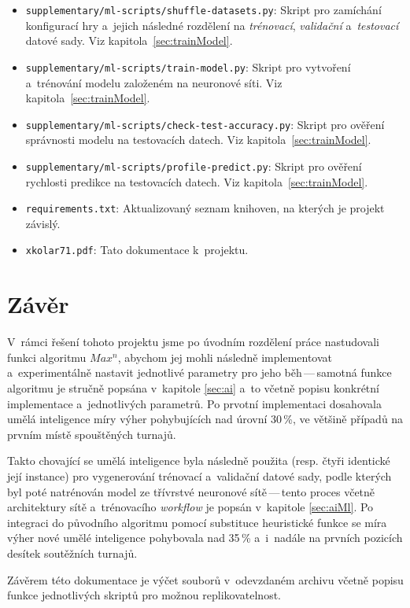 \documentclass[11pt, a4paper]{article}
\theoremstyle{definition}
\begin{document}
\begin{itemize}
    \item
        \texttt{supplementary/ml-scripts/shuffle-datasets.py}: Skript pro
        zamíchání konfigurací hry a~jejich následné rozdělení na
        \emph{trénovací}, \emph{validační} a~\emph{testovací} datové sady. Viz
        kapitola~\ref{sec:trainModel}.

    \item
        \texttt{supplementary/ml-scripts/train-model.py}: Skript pro vytvoření
        a~trénování modelu založeném na neuronové síti. Viz
        kapitola~\ref{sec:trainModel}.

    \item
        \texttt{supplementary/ml-scripts/check-test-accuracy.py}: Skript pro
        ověření správnosti modelu na testovacích datech. Viz
        kapitola~\ref{sec:trainModel}.

    \item
        \texttt{supplementary/ml-scripts/profile-predict.py}: Skript pro ověření
        rychlosti predikce na testovacích datech. Viz
        kapitola~\ref{sec:trainModel}.


    \item
        \texttt{requirements.txt}: Aktualizovaný seznam knihoven, na
        kterých je projekt závislý.

    \item
        \texttt{xkolar71.pdf}: Tato dokumentace k~projektu.
\end{itemize}


\section{Závěr}
\label{sec:con}

V~rámci řešení tohoto projektu jsme po úvodním rozdělení práce nastudovali funkci algoritmu $ Max^n $, abychom jej mohli následně implementovat a~experimentálně nastavit jednotlivé parametry pro jeho běh\,---\,samotná funkce algoritmu je stručně popsána v~kapitole \ref{sec:ai} a~to včetně popisu konkrétní implementace a~jednotlivých parametrů. Po prvotní implementaci dosahovala umělá inteligence míry výher pohybujících nad úrovní 30\,\%, ve většině případů na prvním místě spouštěných turnajů.

Takto chovající se umělá inteligence byla následně použita (resp. čtyři identické její instance) pro vygenerování trénovací a~validační datové sady, podle kterých byl poté natrénován model ze třívrstvé neuronové sítě\,---\,tento proces včetně architektury sítě a~trénovacího \emph{workflow} je popsán v~kapitole \ref{sec:aiMl}. Po integraci do původního algoritmu pomocí substituce heuristické funkce se míra výher nové umělé inteligence pohybovala nad 35\,\% a~i~nadále na prvních pozicích desítek soutěžních turnajů.

Závěrem této dokumentace je výčet souborů v~odevzdaném archivu včetně popisu funkce jednotlivých skriptů pro možnou replikovatelnost.




\end{document}
